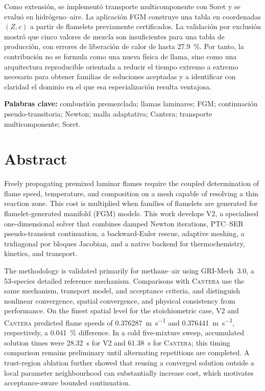 \documentclass[12pt,a4paper,twoside,openany]{book}
\newcommand{\Vdos}{\textsc{V2}\xspace}
\newcommand{\Cantera}{\textsc{Cantera}\xspace}
\begin{document}
Como extensión, se implementó transporte multicomponente con Soret y se evaluó
en hidrógeno--aire. La aplicación FGM construye una tabla en coordenadas
\((Z,c)\) a partir de flamelets previamente certificados. La validación por
exclusión mostró que cinco valores de mezcla son insuficientes para una tabla de
producción, con errores de liberación de calor de hasta \SI{27.9}{\percent}.
Por tanto, la contribución no se formula como una nueva física de llama, sino
como una arquitectura reproducible orientada a reducir el tiempo extremo a
extremo necesario para obtener familias de soluciones aceptadas y a identificar
con claridad el dominio en el que esa especialización resulta ventajosa.

\textbf{Palabras clave:} combustión premezclada; llamas laminares; FGM;
continuación pseudo-transitoria; Newton; malla adaptativa; Cantera; transporte
multicomponente; Soret.

\cleardoublepage
\chapter*{Abstract}
Freely propagating premixed laminar flames require the coupled determination of
flame speed, temperature, and composition on a mesh capable of resolving a thin
reaction zone. This cost is multiplied when families of flamelets are generated
for flamelet-generated manifold (FGM) models. This work develops \Vdos, a
specialised one-dimensional solver that combines damped Newton iterations,
PTC--SER pseudo-transient continuation, a backward-Euler rescue, adaptive
meshing, a tridiagonal por bloques Jacobian, and a native backend for thermochemistry,
kinetics, and transport.

The methodology is validated primarily for methane--air using GRI-Mech~3.0, a
53-species detailed reference mechanism. Comparisons with \Cantera use the same
mechanism, transport model, and acceptance criteria, and distinguish nonlinear
convergence, spatial convergence, and physical consistency from performance. On
the finest spatial level for the stoichiometric case, \Vdos and \Cantera
predicted flame speeds of \SI{0.376287}{\metre\per\second} and
\SI{0.376441}{\metre\per\second}, respectively, a
\SI{0.041}{\percent} difference. In a cold five-mixture sweep, accumulated
solution times were \SI{28.32}{\second} for \Vdos and
\SI{61.38}{\second} for \Cantera; this timing comparison remains
preliminary until alternating repetitions are completed. A trust-region
ablation further showed that reusing a converged solution outside a local
parameter neighbourhood can substantially increase cost, which motivates
acceptance-aware bounded continuation.
\end{document}
